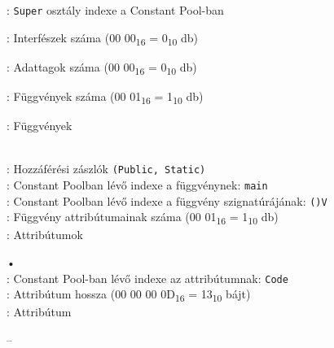 \begin{compactitem}
\item {}: \lstinline{Super} osztály indexe a Constant Pool-ban
\item {}: Interfészek száma (00 00\textsubscript{16} = 0\textsubscript{10} db)
\item {}: Adattagok száma (00 00\textsubscript{16} = 0\textsubscript{10} db)
\item {}: Függvények száma (00 01\textsubscript{16} = 1\textsubscript{10} db)
\item {}: Függvények
\begin{compactitem}
    \setlength\itemsep{-5px}
    \item {}     \\
    : Hozzáférési zászlók \lstinline{(Public, Static)} \\
    : Constant Poolban lévő indexe a függvénynek: \lstinline{main} \\
    : Constant Poolban lévő indexe a függvény szignatúrájának: \lstinline{()V} \\
    : Függvény attribútumainak száma (00 01\textsubscript{16} = 1\textsubscript{10} db) \\
    : Attribútumok
    \begin{compactitem}
        \setlength\itemsep{-5px}
        \item[•]    \\
        : Constant Pool-ban lévő indexe az attribútumnak: \lstinline{Code} \\
        : Attribútum hossza (00 00 00 0D\textsubscript{16} = 13\textsubscript{10} bájt) \\
        : Attribútum
            \begin{compactitem}
            \setlength\itemsep{0px}
                \item[–]       \\

\end{compactitem}
\end{compactitem}
\end{compactitem}
\end{compactitem}
